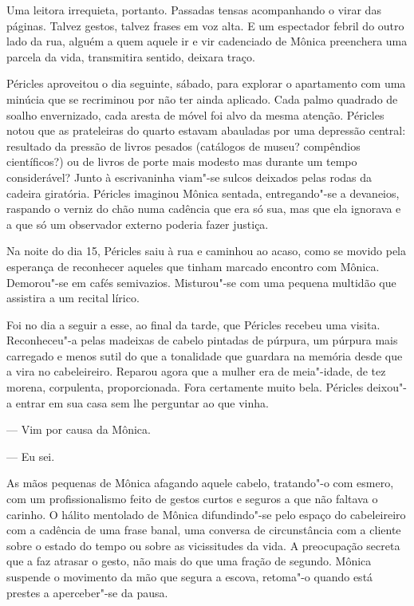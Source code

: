 Uma leitora irrequieta, portanto. Passadas tensas acompanhando o virar
das páginas. Talvez gestos, talvez frases em voz alta. E um espectador
febril do outro lado da rua, alguém a quem aquele ir e vir cadenciado de
Mônica preenchera uma parcela da vida, transmitira sentido, deixara
traço.

Péricles aproveitou o dia seguinte, sábado, para explorar o apartamento
com uma minúcia que se recriminou por não ter ainda aplicado. Cada palmo
quadrado de soalho envernizado, cada aresta de móvel foi alvo da mesma
atenção. Péricles notou que as prateleiras do quarto estavam abauladas
por uma depressão central: resultado da pressão de livros pesados
(catálogos de museu? compêndios científicos?) ou de livros de porte
mais modesto mas durante um tempo considerável? Junto à escrivaninha
viam"-se sulcos deixados pelas rodas da cadeira giratória. Péricles
imaginou Mônica sentada, entregando"-se a devaneios, raspando o verniz do
chão numa cadência que era só sua, mas que ela ignorava e a que só um
observador externo poderia fazer justiça.

Na noite do dia 15, Péricles saiu à rua e caminhou ao acaso, como se
movido pela esperança de reconhecer aqueles que tinham marcado encontro com Mônica. Demorou"-se em cafés
semivazios. Misturou"-se com uma pequena multidão que assistira a um
recital lírico.

Foi no dia a seguir a esse, ao final da tarde, que Péricles recebeu uma
visita. Reconheceu"-a pelas madeixas de cabelo pintadas de púrpura, um
púrpura mais carregado e menos sutil do que a tonalidade que guardara
na memória desde que a vira no cabeleireiro. Reparou agora que a mulher
era de meia"-idade, de tez morena, corpulenta, proporcionada. Fora
certamente muito bela. Péricles deixou"-a entrar em sua casa sem lhe
perguntar ao que vinha.

--- Vim por causa da Mônica.

--- Eu sei.


As mãos pequenas de Mônica afagando aquele cabelo, tratando"-o com
esmero, com um profissionalismo feito de gestos curtos e seguros a que
não faltava o carinho. O hálito mentolado de Mônica difundindo"-se pelo
espaço do cabeleireiro com a cadência de uma frase banal, uma conversa
de circunstância com a cliente sobre o estado do tempo ou sobre as
vicissitudes da vida. A preocupação secreta que a faz atrasar o gesto,
não mais do que uma fração de segundo. Mônica suspende o movimento da
mão que segura a escova, retoma"-o quando está prestes a aperceber"-se da
pausa.

